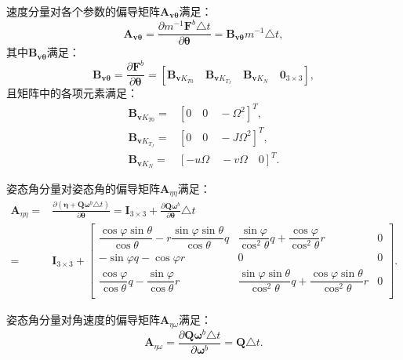 速度分量对各个参数的偏导矩阵$\bm{A}_{\bm{v\theta}}$满足：
\begin{equation}
    \bm{A}_{\bm{v \theta}} = \frac{\partial m^{-1}\bm{F}^b \triangle t}{\partial \bm{\theta}} = \bm{B}_{\bm{v\theta}} m^{-1} \triangle t,
\end{equation}
其中$\bm{B}_{\bm{v\theta}}$满足：
\begin{equation}
    \bm{B}_{\bm{v\theta}} = \frac{\partial \bm{F}^b }{\partial \bm{\theta}} = [
        \bm{B}_{\bm{v}K_{T0}} \quad
        \bm{B}_{\bm{v}K_{T_J}} \quad
        \bm{B}_{\bm{v}K_{N}} \quad
        \bm{0}_{3 \times 3}
        ],
\end{equation}
且矩阵中的各项元素满足：
\begin{equation}
    \begin{aligned}
        \bm{B}_{\bm{v}K_{T0}} =& [0 \quad 0 \quad -\Omega^2]^T, \\
        \bm{B}_{\bm{v}K_{T_J}} =& [0 \quad 0 \quad -J\Omega^2]^T, \\
        \bm{B}_{\bm{v}K_{N}} =& [-u \Omega \quad -v \Omega \quad 0]^T.
    \end{aligned}
\end{equation}

姿态角分量对姿态角的偏导矩阵$\bm{A}_{\eta\eta}$满足：
\begin{equation}
    \begin{aligned}
        \bm{A}_{\eta\eta} =& \frac{\partial (\bm{\eta} + \bm{Q}\bm{\omega}^b \triangle t)}{\partial \bm{\theta}} = \bm{I}_{3 \times 3} + \frac{\partial \bm{Q}\bm{\omega}^b}{\partial \bm{\theta}}\triangle t \\[6pt]
        =& \bm{I}_{3 \times 3} + 
        \begin{bmatrix}
            \dfrac{\cos\varphi\sin\theta}{\cos\theta} - r\dfrac{\sin\varphi\sin\theta}{\cos\theta}q & \dfrac{\sin\varphi}{\cos^2\theta}q + \dfrac{\cos\varphi}{\cos^2\theta}r & 0 \\[6pt]
            -\sin\varphi q - \cos\varphi r & 0 & 0 \\[6pt]
            \dfrac{\cos\varphi}{\cos\theta}q - \dfrac{\sin\varphi}{\cos\theta}r & \dfrac{\sin\varphi\sin\theta}{\cos^2\theta}q + \dfrac{\cos\varphi\sin\theta}{\cos^2\theta}r & 0\\[6pt]
        \end{bmatrix}.
    \end{aligned}
\end{equation}

姿态角分量对角速度的偏导矩阵$\bm{A}_{\eta\omega}$满足：
\begin{equation}
    \bm{A}_{\eta\omega} = \frac{\partial \bm{Q}\bm{\omega}^b \triangle t}{\partial \bm{\omega}^b} = \bm{Q}\triangle t.
\end{equation}

